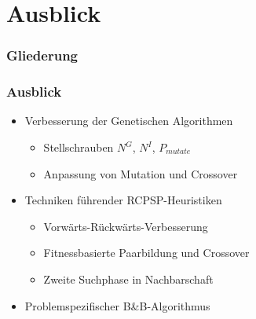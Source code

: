 \section{Ausblick}

\begin{frame}[noframenumbering]
\frametitle{Gliederung}
\end{frame}

\begin{frame}
\frametitle{Ausblick}
\begin{itemize}
\item Verbesserung der Genetischen Algorithmen
	\begin{itemize}
	\item Stellschrauben $N^G$, $N^I$, $P_{mutate}$
	\item Anpassung von Mutation und Crossover\\[6mm]
	\end{itemize}
\item Techniken führender RCPSP-Heuristiken
	\begin{itemize}
	\item Vorwärts-Rückwärts-Verbesserung
	\item Fitnessbasierte Paarbildung und Crossover
	\item Zweite Suchphase in Nachbarschaft\\[6mm]
	\end{itemize}
\item Problemspezifischer B\&B-Algorithmus
\end{itemize}
\end{frame}




